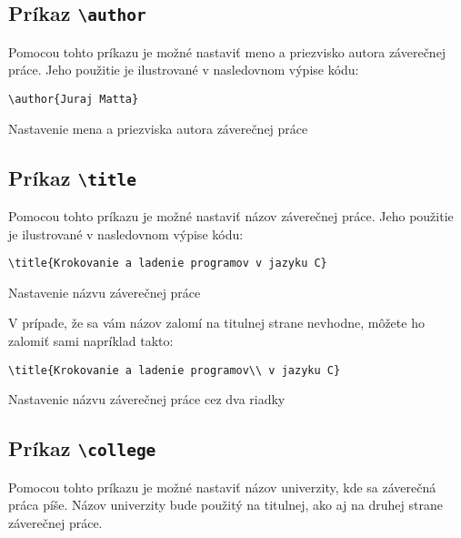 \subsection{Príkaz {\tt \textbackslash{}author}}

Pomocou tohto príkazu je možné nastaviť meno a priezvisko autora záverečnej práce. Jeho použitie je ilustrované v nasledovnom výpise kódu:

\begin{listing}[ht]
\begin{verbatim}
\author{Juraj Matta}
\end{verbatim}
\caption{Nastavenie mena a priezviska autora záverečnej práce}
\end{listing}


\subsection{Príkaz {\tt \textbackslash{}title}}

Pomocou tohto príkazu je možné nastaviť názov záverečnej práce. Jeho použitie je ilustrované v nasledovnom výpise kódu:

\begin{listing}[ht]
\begin{verbatim}
\title{Krokovanie a ladenie programov v jazyku C}
\end{verbatim}
\caption{Nastavenie názvu záverečnej práce}
\end{listing}

V prípade, že sa vám názov zalomí na titulnej strane nevhodne, môžete ho zalomiť sami napríklad takto:

\begin{listing}[ht]
\begin{verbatim}
\title{Krokovanie a ladenie programov\\ v jazyku C}
\end{verbatim}
\caption{Nastavenie názvu záverečnej práce cez dva riadky}
\end{listing}


\subsection{Príkaz {\tt \textbackslash{}college}}

Pomocou tohto príkazu je možné nastaviť názov univerzity, kde sa záverečná práca píše. Názov univerzity bude použitý na titulnej, ako aj na druhej strane záverečnej práce.

